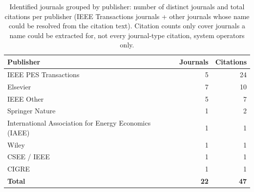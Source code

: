 \begin{table}[htbp]
\centering
\small
\begin{tabular}{lrr}
\toprule
Publisher & Journals & Citations \\
\midrule
    IEEE PES Transactions & 5 & 24 \\
    Elsevier & 7 & 10 \\
    IEEE Other & 5 & 7 \\
    Springer Nature & 1 & 2 \\
    International Association for Energy Economics (IAEE) & 1 & 1 \\
    Wiley & 1 & 1 \\
    CSEE / IEEE & 1 & 1 \\
    CIGRE & 1 & 1 \\
\midrule
    \textbf{Total} & \textbf{22} & \textbf{47} \\
\bottomrule
\end{tabular}
\caption{Identified journals grouped by publisher: number of distinct journals and total citations per publisher (IEEE Transactions journals + other journals whose name could be resolved from the citation text). Citation counts only cover journals a name could be extracted for, not every journal-type citation, system operators only.}
\label{tab:publisher_groups_system_operators}
\end{table}
